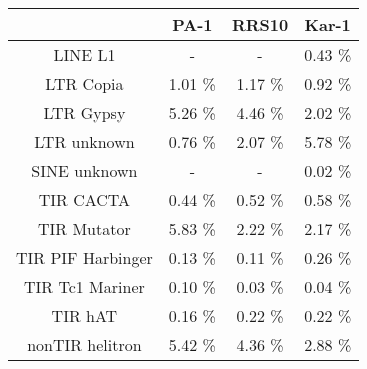 \documentclass{article}
\begin{document}
\begin{table}
    \begin{tabular}{c|c|c|c}
       & PA-1 & RRS10 & Kar-1\\ \hline
       LINE L1 & - & - & 0.43 \%\\ \hline
       LTR Copia  & 1.01 \% & 1.17 \%  & 0.92 \%\\ \hline
       LTR Gypsy  & 5.26 \% & 4.46 \% & 2.02 \%\\ \hline
       LTR unknown& 0.76 \% & 2.07 \% & 5.78 \%\\ \hline
       SINE unknown& - & - & 0.02 \%\\ \hline
       TIR CACTA & 0.44 \% & 0.52 \%  & 0.58 \%\\ \hline
       TIR Mutator& 5.83 \% & 2.22 \% & 2.17 \%\\ \hline
       TIR PIF Harbinger& 0.13 \% & 0.11 \% & 0.26 \%\\ \hline
       TIR Tc1 Mariner & 0.10 \% & 0.03 \%  & 0.04 \%\\ \hline
       TIR hAT & 0.16 \% & 0.22 \%  & 0.22 \%\\ \hline
       nonTIR helitron & 5.42 \% & 4.36 \%  & 2.88 \%\\ 
    \end{tabular}
\end{table}
\end{document}

